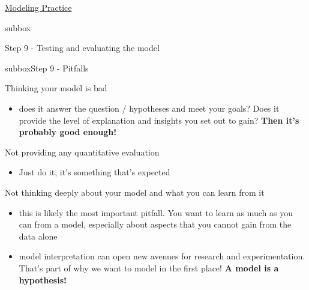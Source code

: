 \begin{textbox}{\href{https://compneuro.neuromatch.io/projects/modelingsteps/ModelingSteps_5through10.html}{Modeling Practice  } }
\begin{subbox}{subbox}{Step 9 - Testing and evaluating the model

}
 \end{subbox}
\begin{subbox}{subbox}{Step 9 - Pitfalls }
\scriptsize

Thinking your model is bad
\begin{itemize}
    \item does it answer the question / hypotheses and meet your goals? Does it provide the level of explanation and insights you set out to gain? \textbf{Then it's probably good enough!} \end{itemize}

Not providing any quantitative evaluation
\begin{itemize}
    \item Just do it, it's something that's expected\end{itemize}

Not thinking deeply about your model and what you can learn from it
\begin{itemize}
    \item this is likely the most important pitfall. You want to learn as much as you can from a model, especially about aspects that you cannot gain from the data alone
    \item model interpretation can open new avenues for research and experimentation. That's part of why we want to model in the first place! \textbf{A model is a hypothesis!}\end{itemize}

\end{subbox}
 
 
\end{textbox}
